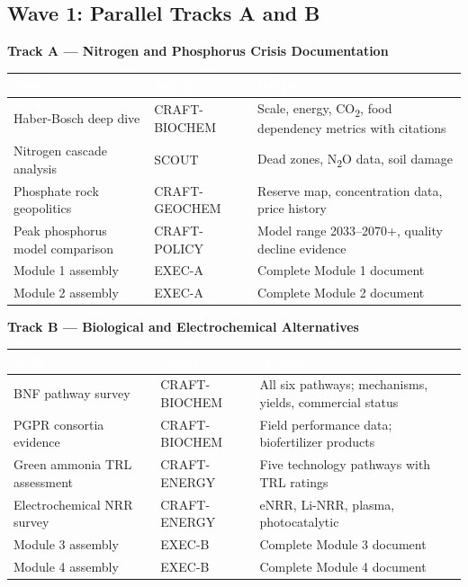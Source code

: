 \documentclass[11pt,letterpaper]{article}
\newcommand{\tableheader}[1]{\textbf{\sffamily\textcolor{white}{#1}}}
\begin{document}
\subsection{Wave 1: Parallel Tracks A and B}

\textbf{Track A --- Nitrogen and Phosphorus Crisis Documentation}

\begin{center}
\begin{tabularx}{\textwidth}{L{3cm}L{2.5cm}X}
\toprule
{}
\tableheader{Task} & \tableheader{Agent} & \tableheader{Output} \\
\midrule
Haber-Bosch deep dive & CRAFT-BIOCHEM & Scale, energy, CO\textsubscript{2}, food dependency metrics with citations \\
Nitrogen cascade analysis & SCOUT & Dead zones, N\textsubscript{2}O data, soil damage \\
Phosphate rock geopolitics & CRAFT-GEOCHEM & Reserve map, concentration data, price history \\
Peak phosphorus model comparison & CRAFT-POLICY & Model range 2033--2070+, quality decline evidence \\
Module 1 assembly & EXEC-A & Complete Module 1 document \\
Module 2 assembly & EXEC-A & Complete Module 2 document \\
\bottomrule
\end{tabularx}
\end{center}

\textbf{Track B --- Biological and Electrochemical Alternatives}

\begin{center}
\begin{tabularx}{\textwidth}{L{3cm}L{2.5cm}X}
\toprule
{}
\tableheader{Task} & \tableheader{Agent} & \tableheader{Output} \\
\midrule
BNF pathway survey & CRAFT-BIOCHEM & All six pathways; mechanisms, yields, commercial status \\
PGPR consortia evidence & CRAFT-BIOCHEM & Field performance data; biofertilizer products \\
Green ammonia TRL assessment & CRAFT-ENERGY & Five technology pathways with TRL ratings \\
Electrochemical NRR survey & CRAFT-ENERGY & eNRR, Li-NRR, plasma, photocatalytic \\
Module 3 assembly & EXEC-B & Complete Module 3 document \\
Module 4 assembly & EXEC-B & Complete Module 4 document \\
\bottomrule
\end{tabularx}
\end{center}
\end{document}
